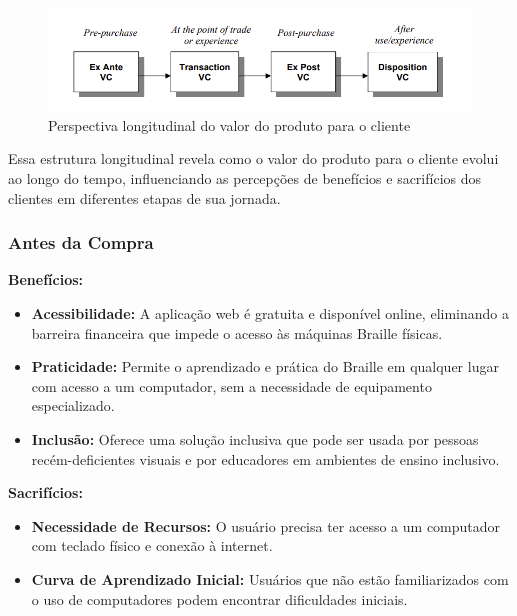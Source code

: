 \begin{figure}[h]
    \centering
    \includegraphics[scale=0.7]{ch03/assets/longitudinal-perspective.png}
    \decoRule
    \caption[Perspectiva longitudinal do valor do produto para o cliente]{Perspectiva longitudinal do valor do produto para o cliente \parencite{ARTICLE10}}
    \label{fig:ch02-longitudinal-perspective}
\end{figure}

Essa estrutura longitudinal revela como o valor do produto para o cliente evolui ao longo do tempo, influenciando as percepções de benefícios e sacrifícios dos clientes em diferentes etapas de sua jornada.

\subsubsection{Antes da Compra}

\textbf{Benefícios:}

\begin{itemize}
    \item \textbf{Acessibilidade:} A aplicação web é gratuita e disponível online, eliminando a barreira financeira que impede o acesso às máquinas Braille físicas.
    \item \textbf{Praticidade:} Permite o aprendizado e prática do Braille em qualquer lugar com acesso a um computador, sem a necessidade de equipamento especializado.
    \item \textbf{Inclusão:} Oferece uma solução inclusiva que pode ser usada por pessoas recém-deficientes visuais e por educadores em ambientes de ensino inclusivo.
\end{itemize}

\textbf{Sacrifícios:}

\begin{itemize}
    \item \textbf{Necessidade de Recursos:} O usuário precisa ter acesso a um computador com teclado físico e conexão à internet.
    \item \textbf{Curva de Aprendizado Inicial:} Usuários que não estão familiarizados com o uso de computadores podem encontrar dificuldades iniciais.
\end{itemize}

